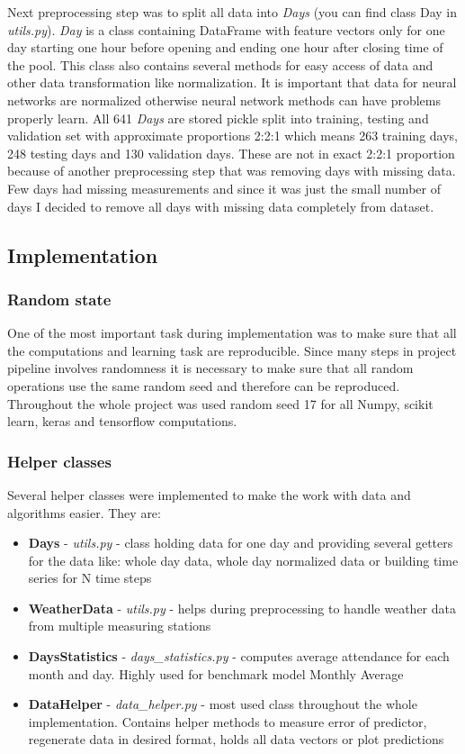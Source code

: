 \documentclass{article}
\begin{document}
Next preprocessing step was to split all data into \emph{Days} (you can find class Day in \emph{utils.py}). \emph{Day} is a class containing DataFrame with feature vectors only for one day starting one hour before opening and ending one hour after closing time of the pool. This class also contains several methods for easy access of data and other data transformation like normalization. It is important that data for neural networks are normalized otherwise neural network methods can have problems properly learn. All 641 \emph{Days} are stored pickle split into training, testing and validation set with approximate proportions 2:2:1 which means 263 training days, 248 testing days and 130 validation days. These are not in exact 2:2:1 proportion because of another preprocessing step that was removing days with missing data. Few days had missing measurements and since it was just the small number of days I decided to remove all days with missing data completely from dataset.

\subsection{Implementation}
\subsubsection{Random state}
One of the most important task during implementation was to make sure that all the computations and learning task are reproducible. Since many steps in project pipeline involves randomness it is necessary to make sure that all random operations use the same random seed and therefore can be reproduced. Throughout the whole project was used random seed 17 for all Numpy, scikit learn, keras and tensorflow computations.

\subsubsection{Helper classes}
Several helper classes were implemented to make the work with data and algorithms easier. They are:
\begin{itemize}
    \item \textbf{Days} - \emph{utils.py} - class holding data for one day and providing several getters for the data like: whole day data, whole day normalized data or building time series for N time steps	        	\item \textbf{WeatherData} - \emph{utils.py} - helps during preprocessing to handle weather data from multiple measuring stations
    \item \textbf{DaysStatistics} - \emph{days\_statistics.py} - computes average attendance for each month and day. Highly used for benchmark model Monthly Average
    \item \textbf{DataHelper} - \emph{data\_helper.py} - most used class throughout the whole implementation. Contains helper methods to measure error of predictor, regenerate data in desired format, holds all data vectors or plot predictions
\end{itemize}
\end{document}
